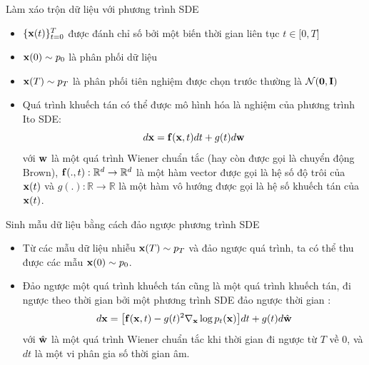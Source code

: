 \documentclass[10pt]{beamer}
\theoremstyle{remark}
\numberwithin{algocf}{section}
\numberwithin{equation}{section}
\numberwithin{dl}{section}
\numberwithin{figure}{section}
\begin{document}
\begin{frame}{Làm xáo trộn dữ liệu với phương trình SDE}
	\begin{itemize}
		\item $\lbrace \bold{x}(t) \rbrace_{t=0}^T$ được đánh chỉ số bởi một biến thời gian liên tục $t \in \lbrack 0, T \rbrack$
		\item $\bold{x}(0) \sim p_0$ là phân phối dữ liệu
		\item $\bold{x}(T) \sim p_T$ là phân phối tiên nghiệm được chọn trước thường là $\mathcal{N}(\bold{0}, \bold{I})$
		\item Quá trình khuếch tán có thể được mô hình hóa là nghiệm của phương trình Ito SDE:
		\begin{equation} \label{eq:5}
			d \bold{x} = \bold{f} (\bold{x}, t) dt + g(t) d \bold{w}
		\end{equation}
		với $\bold{w}$ là một quá trình Wiener chuẩn tắc (hay còn được gọi là chuyển động Brown), $\bold{f}(.,t): \mathbb{R}^d \rightarrow \mathbb{R}^d$ là một hàm vector được gọi là hệ số độ trôi của $\bold{x}(t)$ và $g(.): \mathbb{R} \rightarrow \mathbb{R}$ là một hàm vô hướng được gọi là hệ số khuếch tán của $\bold{x}(t)$.
	\end{itemize}
\end{frame}

\begin{frame}{Sinh mẫu dữ liệu bằng cách đảo ngược phương trình SDE}
	\begin{itemize}
		\item Từ các mẫu dữ liệu nhiễu $\bold{x}(T) \sim p_T$ và đảo ngược quá trình, ta có thể thu được các mẫu $\bold{x}(0) \sim p_0$.
		\item Đảo ngược một quá trình khuếch tán cũng là một quá trình khuếch tán, đi ngược theo thời gian bởi một phương trình SDE đảo ngược thời gian \citep{anderson1982reverse}:
		\begin{equation} \label{eq:6}
			d \bold{x} = \big \lbrack \bold{f}(\bold{x}, t) - g(t)^2 \nabla_{\bold{x}} \log p_t (\bold{x}) \big \rbrack dt + g(t) d \hat{\bold{w}}
		\end{equation}
		với $\hat{\bold{w}}$ là một quá trình Wiener chuẩn tắc khi thời gian đi ngược từ $T$ về $0$, và $dt$ là một vi phân gia số thời gian âm.
	\end{itemize}
\end{frame}
\end{document}
